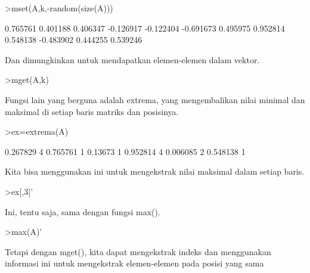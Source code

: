 \documentclass[a4paper,10pt]{article}
\begin{document}
\begin{eulernotebook}
\begin{eulercomment}
\begin{eulercomment}
\begin{eulercomment}
\begin{eulercomment}
\begin{eulerprompt}
>mset(A,k,-random(size(A)))
\end{eulerprompt}
\begin{euleroutput}
       0.765761      0.401188      0.406347     -0.126917 
      -0.122404     -0.691673      0.495975      0.952814 
       0.548138     -0.483902      0.444255      0.539246 
\end{euleroutput}
\begin{eulercomment}
Dan dimungkinkan untuk mendapatkan elemen-elemen dalam vektor.
\end{eulercomment}
\begin{eulerprompt}
>mget(A,k)
\end{eulerprompt}
\begin{euleroutput}
  [0.267829,  0.13673,  0.390567,  0.006085]
\end{euleroutput}
\begin{eulercomment}
Fungsi lain yang berguna adalah extrema, yang mengembalikan nilai
minimal dan maksimal di setiap baris matriks dan posisinya.
\end{eulercomment}
\begin{eulerprompt}
>ex=extrema(A)
\end{eulerprompt}
\begin{euleroutput}
       0.267829             4      0.765761             1 
        0.13673             1      0.952814             4 
       0.006085             2      0.548138             1 
\end{euleroutput}
\begin{eulercomment}
Kita bisa menggunakan ini untuk mengekstrak nilai maksimal dalam
setiap baris.
\end{eulercomment}
\begin{eulerprompt}
>ex[,3]'
\end{eulerprompt}
\begin{euleroutput}
  [0.765761,  0.952814,  0.548138]
\end{euleroutput}
\begin{eulercomment}
Ini, tentu saja, sama dengan fungsi max().
\end{eulercomment}
\begin{eulerprompt}
>max(A)'
\end{eulerprompt}
\begin{euleroutput}
  [0.765761,  0.952814,  0.548138]
\end{euleroutput}
\begin{eulercomment}
Tetapi dengan mget(), kita dapat mengekstrak indeks dan menggunakan
informasi ini untuk mengekstrak elemen-elemen pada posisi yang sama

\end{eulercomment}
\end{eulercomment}
\end{eulercomment}
\end{eulercomment}
\end{eulercomment}
\end{eulernotebook}
\end{document}
